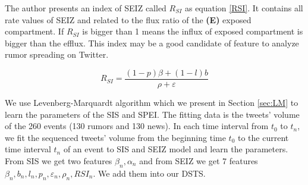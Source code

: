 \begin{table}[!h]
 \centering
{}
\caption{Parameters of SEIZ}
\label{tab:SEIZ_Para}
\end{table}
The author presents an index of SEIZ called $R_{SI}$ as equation \ref{RSI}. It contains all rate values of SEIZ and related to the flux ratio of the \textbf{(E)} exposed compartment. If $R_{SI}$ is bigger than 1 means the influx of exposed compartment is bigger than the efflux. This index may be a good candidate of feature to analyze rumor spreading on Twitter.


\begin{equation}
\label{RSI}
R_{SI}=\frac{(1-p)\beta+(1-l)b}{\rho+\varepsilon}  
\end{equation}

We use Levenberg-Marquardt algorithm which we present in Section \ref{sec:LM} to learn the parameters of the SIS and SPEI. The fitting data is the tweets' volume of the 260 events  (130 rumors and 130 news). 
 In each time interval from $t_0$ to $t_n$, we fit the sequenced  tweets' volume from the beginning time $t_0$ to the current time interval $t_n$ of an event to SIS and SEIZ model and learn the parameters. From SIS we get two features $\beta_{n},\alpha_{n}$ and from SEIZ we get 7 features $\beta_{n},b_{n},l_{n},p_{n},\varepsilon_{n},\rho_{n},RSI_{n}$. We add them into our DSTS.
 
